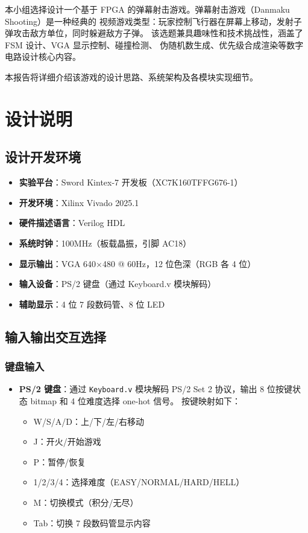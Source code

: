 \documentclass[12pt,a4paper]{ctexart}
\begin{document}
本小组选择设计一个基于 FPGA 的弹幕射击游戏。弹幕射击游戏（Danmaku Shooting）是一种经典的
视频游戏类型：玩家控制飞行器在屏幕上移动，发射子弹攻击敌方单位，同时躲避敌方子弹。
该选题兼具趣味性和技术挑战性，涵盖了 FSM 设计、VGA 显示控制、碰撞检测、
伪随机数生成、优先级合成渲染等数字电路设计核心内容。

本报告将详细介绍该游戏的设计思路、系统架构及各模块实现细节。

\section{设计说明}

\subsection{设计开发环境}

\begin{itemize}
    \item \textbf{实验平台}：Sword Kintex-7 开发板（XC7K160TFFG676-1）
    \item \textbf{开发环境}：Xilinx Vivado 2025.1
    \item \textbf{硬件描述语言}：Verilog HDL
    \item \textbf{系统时钟}：100MHz（板载晶振，引脚 AC18）
    \item \textbf{显示输出}：VGA 640$\times$480 @ 60Hz，12 位色深（RGB 各 4 位）
    \item \textbf{输入设备}：PS/2 键盘（通过 Keyboard.v 模块解码）
    \item \textbf{辅助显示}：4 位 7 段数码管、8 位 LED
\end{itemize}

\subsection{输入输出交互选择}

\subsubsection{键盘输入}

\begin{itemize}
    \item \textbf{PS/2 键盘}：通过 \texttt{Keyboard.v} 模块解码 PS/2 Set 2 协议，输出 8 位按键状态 bitmap
    和 4 位难度选择 one-hot 信号。
    按键映射如下：
    \begin{itemize}
        \item W/S/A/D：上/下/左/右移动
        \item J：开火/开始游戏
        \item P：暂停/恢复
        \item 1/2/3/4：选择难度（EASY/NORMAL/HARD/HELL）
        \item M：切换模式（积分/无尽）
        \item Tab：切换 7 段数码管显示内容
    \end{itemize}
\end{itemize}
\end{document}
